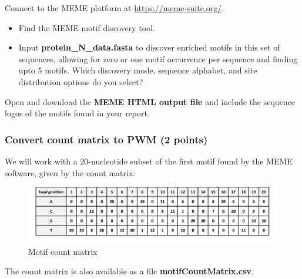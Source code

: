 \documentclass[
  a4paper,
  DIV=11,
  numbers=noendperiod]{scrartcl}
\providecommand{\tightlist}{%
  \setlength{\itemsep}{0pt}\setlength{\parskip}{0pt}}\usepackage{longtable,booktabs,array}
\begin{document}
Connect to the MEME platform at \url{https://meme-suite.org/}.

\begin{itemize}
\tightlist
\item
  Find the MEME motif discovery tool.
\item
  Input \textbf{protein\_N\_data.fasta} to discover enriched motifs in
  this set of sequences, allowing for zero or one motif occurrence per
  sequence and finding upto 5 motifs. Which discovery mode, sequence
  alphabet, and site distribution options do you select?
\end{itemize}

Open and download the \textbf{MEME HTML output file} and include the
sequence logos of the motifs found in your report.

\hypertarget{convert-count-matrix-to-pwm-2-points}{%
\subsubsection{Convert count matrix to PWM (2
points)}\label{convert-count-matrix-to-pwm-2-points}}

We will work with a 20-nucleotide subset of the first motif found by the
MEME software, given by the count matrix:

\begin{figure}

{\centering \includegraphics{assgn2_motif_counts.png}

}

\caption{Motif count matrix}

\end{figure}

The count matrix is also available as a file
\textbf{motifCountMatrix.csv}.
\end{document}
